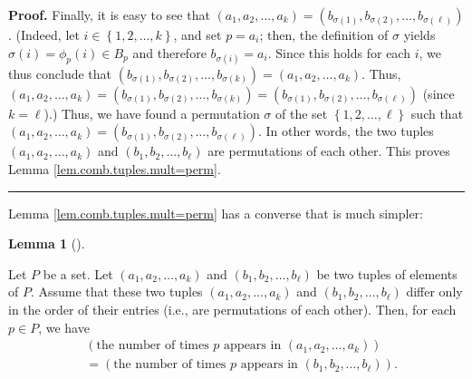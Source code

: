 \documentclass[numbers=enddot,12pt,final,onecolumn,notitlepage]{scrartcl}%
\numberwithin{exer}{subsection}
\theoremstyle{definition}
\newtheorem{lem}[theo]{Lemma}
\newenvironment{lemma}[1][]
{\begin{lem}[#1]\begin{leftbar}}
{\end{leftbar}\end{lem}}
\newenvironment{fineprint}{\begin{small}}{\end{small}}
\newenvironment{proof}[1][Proof]{\noindent\textbf{#1.} }{\ \rule{0.5em}{0.5em}}
\begin{document}
\begin{fineprint}
\begin{proof}
Finally, it is easy to see that $\left(  a_{1},a_{2},\ldots,a_{k}\right)
=\left(  b_{\sigma\left(  1\right)  },b_{\sigma\left(  2\right)  }%
,\ldots,b_{\sigma\left(  \ell\right)  }\right)  $. (Indeed, let $i\in\left\{
1,2,\ldots,k\right\}  $, and set $p=a_{i}$; then, the definition of $\sigma$
yields $\sigma\left(  i\right)  =\phi_{p}\left(  i\right)  \in B_{p}$ and
therefore $b_{\sigma\left(  i\right)  }=a_{i}$. Since this holds for each $i$,
we thus conclude that $\left(  b_{\sigma\left(  1\right)  },b_{\sigma\left(
2\right)  },\ldots,b_{\sigma\left(  k\right)  }\right)  =\left(  a_{1}%
,a_{2},\ldots,a_{k}\right)  $. Thus, $\left(  a_{1},a_{2},\ldots,a_{k}\right)
=\left(  b_{\sigma\left(  1\right)  },b_{\sigma\left(  2\right)  }%
,\ldots,b_{\sigma\left(  k\right)  }\right)  =\left(  b_{\sigma\left(
1\right)  },b_{\sigma\left(  2\right)  },\ldots,b_{\sigma\left(  \ell\right)
}\right)  $ (since $k=\ell$).) Thus, we have found a permutation $\sigma$ of
the set $\left\{  1,2,\ldots,\ell\right\}  $ such that $\left(  a_{1}%
,a_{2},\ldots,a_{k}\right)  =\left(  b_{\sigma\left(  1\right)  }%
,b_{\sigma\left(  2\right)  },\ldots,b_{\sigma\left(  \ell\right)  }\right)
$. In other words, the two tuples $\left(  a_{1},a_{2},\ldots,a_{k}\right)  $
and $\left(  b_{1},b_{2},\ldots,b_{\ell}\right)  $ are permutations of each
other. This proves Lemma \ref{lem.comb.tuples.mult=perm}.
\end{proof}
\end{fineprint}

Lemma \ref{lem.comb.tuples.mult=perm} has a converse that is much simpler:

\begin{lemma}
\label{lem.comb.tuples.mult=perm.conv}Let $P$ be a set. Let $\left(
a_{1},a_{2},\ldots,a_{k}\right)  $ and $\left(  b_{1},b_{2},\ldots,b_{\ell
}\right)  $ be two tuples of elements of $P$. Assume that these two tuples
$\left(  a_{1},a_{2},\ldots,a_{k}\right)  $ and $\left(  b_{1},b_{2}%
,\ldots,b_{\ell}\right)  $ differ only in the order of their entries (i.e.,
are permutations of each other). Then, for each $p\in P$, we have%
\begin{align*}
&  \left(  \text{the number of times }p\text{ appears in }\left(  a_{1}%
,a_{2},\ldots,a_{k}\right)  \right) \\
&  =\left(  \text{the number of times }p\text{ appears in }\left(  b_{1}%
,b_{2},\ldots,b_{\ell}\right)  \right)  .
\end{align*}

\end{lemma}
\end{document}
